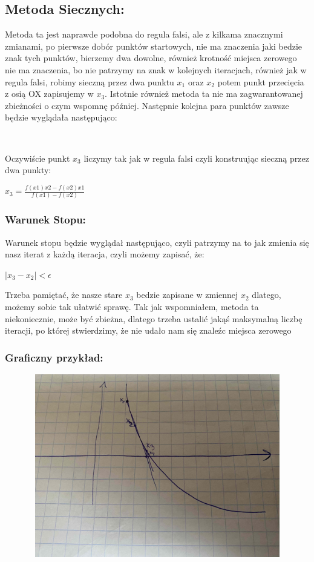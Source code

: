 \documentclass[12pt]{article}
\begin{document}
\subsection{Metoda Siecznych:}
Metoda ta jest naprawde podobna do regula falsi, ale z kilkama znacznymi zmianami, po pierwsze dobór punktów startowych, nie ma znaczenia jaki bedzie znak tych punktów, bierzemy dwa dowolne, również krotność miejsca zerowego nie ma znaczenia, bo nie patrzymy na znak w kolejnych iteracjach, również jak w regula falsi, robimy sieczną przez dwa punktu $x_{1}$ oraz $x_{2}$ potem punkt przecięcia z osią OX zapisujemy w $x_{3}$. Istotnie również metoda ta nie ma zagwarantowanej zbieżności o czym wspomnę później. Następnie kolejna para punktów zawsze będzie wyglądała następująco:
\begin{center}
    \begin{math}
        [x_{2},x_{3}]
    \end{math}
\end{center}
Oczywiście punkt $x_{3}$ liczymy tak jak w regula falsi czyli konstruując sieczną przez dwa punkty:
\begin{center}
    \begin{math}
        x_{3} = \frac{f(x1)x2 - f(x2)x1}{f(x1) - f(x2)}
    \end{math}
\end{center}
\subsubsection*{Warunek Stopu: }
Warunek stopu będzie wyglądał następująco, czyli patrzymy na to jak zmienia się nasz iterat z każdą iteracja, czyli możemy zapisać, że:
\begin{center}
    \begin{math}
        |x_{3}-x_{2}|<\epsilon
    \end{math}
\end{center}
Trzeba pamiętać, że nasze stare $x_{3}$ bedzie zapisane w zmiennej $x_{2}$ dlatego, możemy sobie tak ułatwić sprawę. Tak jak wspomniałem, metoda ta niekoniecznie, może być zbieżna, dlatego trzeba ustalić jakąś maksymalną liczbę iteracji, po której stwierdzimy, że nie udało nam się znaleźc miejsca zerowego
\subsubsection*{Graficzny przykład: }
\includegraphics[width=17cm,height=8cm, keepaspectratio]{sieczne.jpg}
\end{document}
